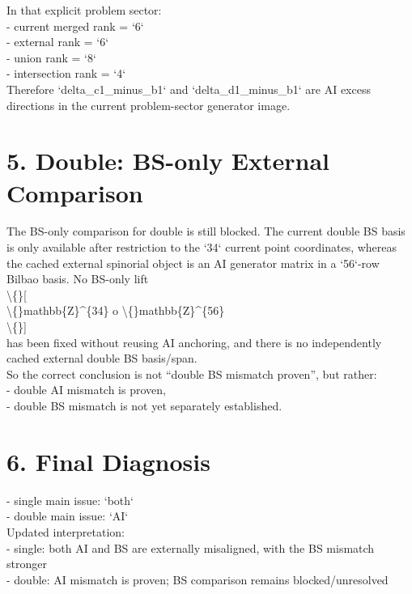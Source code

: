 \documentclass[11pt]{article}
\begin{document}
In that explicit problem sector:\\
- current merged rank = `6`\\
- external rank = `6`\\
- union rank = `8`\\
- intersection rank = `4`\\

Therefore `delta\_c1\_minus\_b1` and `delta\_d1\_minus\_b1` are AI excess directions in the current problem-sector generator image.\\

\section*{5. Double: BS-only External Comparison}

The BS-only comparison for double is still blocked. The current double BS basis is only available after restriction to the `34` current point coordinates, whereas the cached external spinorial object is an AI generator matrix in a `56`-row Bilbao basis. No BS-only lift\\
\textbackslash\{\}[\\
\textbackslash\{\}mathbb\{Z\}\textasciicircum{}\{34\} 	o \textbackslash\{\}mathbb\{Z\}\textasciicircum{}\{56\}\\
\textbackslash\{\}]\\
has been fixed without reusing AI anchoring, and there is no independently cached external double BS basis/span.\\

So the correct conclusion is not “double BS mismatch proven”, but rather:\\
- double AI mismatch is proven,\\
- double BS mismatch is not yet separately established.\\

\section*{6. Final Diagnosis}

- single main issue: `both`\\
- double main issue: `AI`\\

Updated interpretation:\\
- single: both AI and BS are externally misaligned, with the BS mismatch stronger\\
- double: AI mismatch is proven; BS comparison remains blocked/unresolved\\
\end{document}
